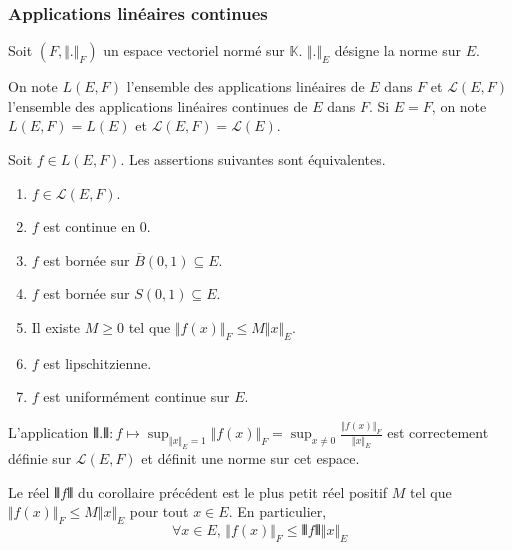 	\subsubsection{Applications linéaires continues}


	Soit $(F, \Vert . \Vert_F)$ un espace vectoriel normé sur $\mathbb{K}$. $\Vert . \Vert_E$ désigne la norme sur $E$.

	\begin{notation}
		On note $L(E,F)$ l'ensemble des applications linéaires de $E$ dans $F$ et $\mathcal{L}(E,F)$ l'ensemble des applications linéaires continues de $E$ dans $F$. Si $E = F$, on note $L(E,F) = L(E)$ et $\mathcal{L}(E,F) = \mathcal{L}(E)$.
	\end{notation}

	\begin{theorem}
		Soit $f \in L(E,F)$. Les assertions suivantes sont équivalentes.
		\begin{enumerate}[label=(\roman*)]
			\item $f \in \mathcal{L}(E,F)$.
			\item $f$ est continue en $0$.
			\item $f$ est bornée sur $\overline{B}(0,1) \subseteq E$.
			\item $f$ est bornée sur $S(0,1) \subseteq E$.
			\item Il existe $M \geq 0$ tel que $\Vert f(x) \Vert_F \leq M \Vert x \Vert_E$.
			\item $f$ est lipschitzienne.
			\item $f$ est uniformément continue sur $E$.
		\end{enumerate}
	\end{theorem}

	\begin{corollary}
		L'application $\VERT . \VERT : f \mapsto \sup_{\Vert x \Vert_E = 1} \Vert f(x) \Vert_F = \sup_{x \neq 0} \frac{\Vert f(x) \Vert_F}{\Vert x \Vert_E}$ est correctement définie sur $\mathcal{L}(E,F)$ et définit une norme sur cet espace.
	\end{corollary}

	\begin{remark}
		Le réel $\VERT f \VERT$ du corollaire précédent est le plus petit réel positif $M$ tel que $\Vert f(x) \Vert_F \leq M \Vert x \Vert_E$ pour tout $x \in E$. En particulier,
		\[ \forall x \in E, \, \Vert f(x) \Vert_F \leq \VERT f \VERT \Vert x \Vert_E \]
	\end{remark}

